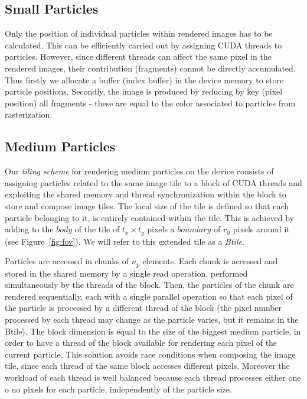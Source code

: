 \documentclass[1p]{elsarticle}
\begin{document}
\subsection{Small Particles}
\label{sec:smallparticles}
Only the position of individual particles within rendered images has to be calculated. This can be efficiently carried out by assigning CUDA threads to particles. However, since different threads can affect the same pixel in the rendered images, their contribution (fragments) cannot be directly accumulated. Thus firstly we allocate a buffer (index buffer) in the device memory to store particle positions. Secondly, the image is produced by reducing by key (pixel position) all fragments - these are equal to the color associated to particles from rasterization. 

\subsection{Medium Particles}
\label{sec:mediumparticles}
Our \textit{tiling scheme} for rendering medium particles on the device consists of assigning particles related to the same image tile to a block of CUDA threads and exploiting the shared memory and thread synchronization within the block to store and compose image tiles. The local size of the tile is defined so that each particle belonging to it, is entirely contained within the tile. This is achieved by adding to the $body$ of the tile of $t_x \times t_y$ pixels a $boundary$ of $r_0$ pixels around it (see Figure~\ref{fig:fov}). We will refer to this extended tile as a \textit{Btile}.

Particles are accessed in chunks of $n_p$ elements. Each chunk is accessed and stored in the shared memory by a single read operation, performed simultaneously by the threads of the block. Then, the particles of the chunk are rendered sequentially, each with a single parallel operation so that each pixel of the particle is processed by a different thread of the block (the pixel number processed by each thread may change as the particle varies, but it remains in the Btile). The block dimension is equal to the size of the biggest medium particle, in order to have a thread of the block available for rendering each pixel of the current particle. 
This solution avoids race conditions when composing the image tile, since each
thread of the same block accesses different pixels. Moreover the workload of each
thread is well balanced because each thread processes either one o no pixels for each particle, independently of the particle size. 
\end{document}
